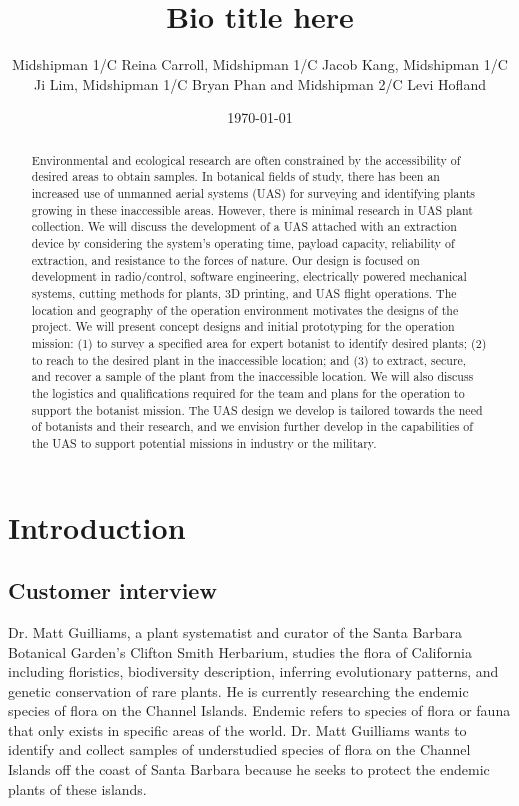 \documentclass{wrcecapstone}
\title{Bio title here}
\author{Midshipman 1/C Reina Carroll, Midshipman 1/C Jacob Kang,  Midshipman 1/C Ji Lim, Midshipman 1/C Bryan Phan and Midshipman 2/C Levi Hofland}
\date{\today}
\begin{document}
\maketitlepage
\cleardoublepage

\clearpage
\maketitle


\begin{abstract}
Environmental and ecological research are often constrained by the accessibility of desired areas to obtain samples. In botanical fields of study, there has been an increased use of unmanned aerial systems (UAS) for surveying and identifying plants growing in these inaccessible areas. However, there is minimal research in UAS plant collection. We will discuss the development of a UAS attached with an extraction device by considering the system’s operating time, payload capacity, reliability of extraction, and resistance to the forces of nature. Our design is focused on development in radio/control, software engineering, electrically powered mechanical systems, cutting methods for plants, 3D printing, and UAS flight operations. The location and geography of the operation environment motivates the designs of the project. We will present concept designs and initial prototyping for the operation mission: (1) to survey a specified area for expert botanist to identify desired plants; (2) to reach to the desired plant in the inaccessible location; and (3) to extract, secure, and recover a sample of the plant from the inaccessible location. We will also discuss the logistics and qualifications required for the team and plans for the operation to support the botanist mission. The UAS design we develop is tailored towards the need of botanists and their research, and we envision further develop in the capabilities of the UAS to support potential missions in industry or the military.
\end{abstract}

\section{Introduction}

\subsection{Customer interview}
Dr. Matt Guilliams, a plant systematist and curator of the Santa Barbara Botanical Garden's Clifton Smith Herbarium, studies the flora of California including floristics, biodiversity description, inferring evolutionary patterns, and genetic conservation of rare plants. He is currently researching the endemic species of flora on the Channel Islands. Endemic refers to species of flora or fauna that only exists in specific areas of the world. Dr. Matt Guilliams wants to identify and collect samples of understudied species of flora on the Channel Islands off the coast of Santa Barbara because he seeks to protect the endemic plants of these islands.
\end{document}
